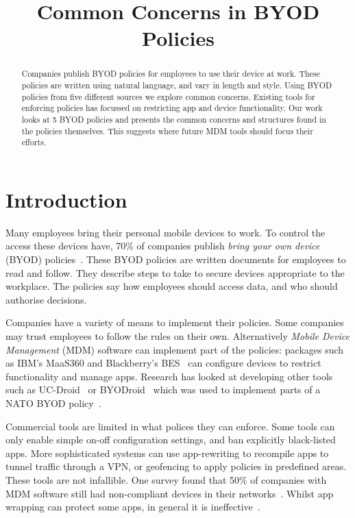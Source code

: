 \documentclass[conference,twocolumn]{IEEEtran}
\title{Common Concerns in BYOD Policies}
\author{%
  \IEEEauthorblockN{Joseph Hallett}
  \IEEEauthorblockA{University of Edinburgh}
  \and
  \IEEEauthorblockN{David Aspinall}
  \IEEEauthorblockA{University of Edinburgh}
}
\begin{document}
\maketitle

\begin{abstract}
  Companies publish BYOD policies for employees to use their device at work.
  These policies are written using natural language, and vary in length and style.
  Using BYOD policies from five different sources we explore common concerns.
  Existing tools for enforcing policies has focussed on restricting app and device functionality.
  Our work looks at 5 BYOD policies and presents the common concerns and structures found in the policies themselves.
  This suggests where future MDM tools should focus their efforts.
\end{abstract}

\section{Introduction}
\label{sec:introduction}

Many employees bring their personal mobile devices to work.
To control the access these devices have, 70\% of companies publish \emph{bring your own device} (BYOD) policies~\cite{schulze_byod_2016}.
These BYOD policies are written documents for employees to read and follow.
They describe steps to take to secure devices appropriate to the workplace.
The policies say how employees should access data, and who should authorise decisions.

Companies have a variety of means to implement their policies.
Some companies may trust employees to follow the rules on their own.
Alternatively \emph{Mobile Device Management} (MDM) software can implement part of the policies: packages such as IBM's MaaS360 and Blackberry's BES~\cite{_ibm_????,_secure_????} can configure devices to restrict functionality and manage apps.
Research has looked at developing other tools such as UC-Droid~\cite{martinelli_enhancing_2016} or BYODroid~\cite{armando_enabling_2014} which was used to implement parts of a NATO BYOD policy~\cite{armando_developing_2016}.

Commercial tools are limited in what polices they can enforce.
Some tools can only enable simple on-off configuration settings, and ban explicitly black-listed apps.
More sophisticated systems can use app-rewriting to recompile apps to tunnel traffic through a VPN, or geofencing to apply policies in predefined areas.
These tools are not infallible.
One survey found that 50\% of companies with MDM software still had non-compliant devices in their networks~\cite{mobileiron_security_labs_q4_2015}.
Whilst app wrapping can protect some apps, in general it is ineffective~\cite{hao_effectiveness_2013}.
\end{document}
